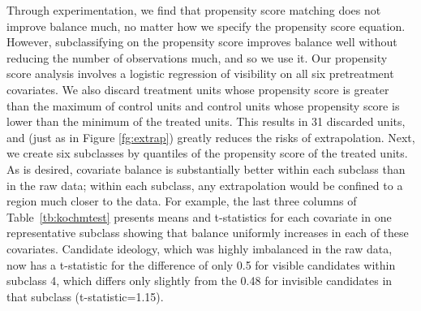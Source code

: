 \documentclass[11pt,titlepage]{article}
\begin{document}
Through experimentation, we find that propensity score matching does
not improve balance much, no matter how we specify the propensity
score equation.  However, subclassifying on the propensity score
improves balance well without reducing the number of observations
much, and so we use it.  Our propensity score analysis involves a
logistic regression of visibility on all six pretreatment covariates.
We also discard treatment units whose propensity score is greater than
the maximum of control units and control units whose propensity score
is lower than the minimum of the treated units.  This results in 31
discarded units, and (just as in Figure \ref{fg:extrap}) greatly
reduces the risks of extrapolation.  Next, we create six subclasses by
quantiles of the propensity score of the treated units.  As is
desired, covariate balance is substantially better within each
subclass than in the raw data; within each subclass, any extrapolation
would be confined to a region much closer to the data.  For example,
the last three columns of Table~\ref{tb:kochmtest} presents means and
t-statistics for each covariate in one representative subclass showing
that balance uniformly increases in each of these covariates.
Candidate ideology, which was highly imbalanced in the raw data, now
has a t-statistic for the difference of only 0.5 for visible
candidates within subclass 4, which differs only slightly from the
0.48 for invisible candidates in that subclass (t-statistic=1.15).
\end{document}
